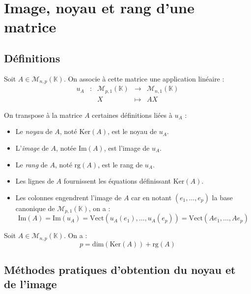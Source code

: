 \documentclass[a4paper,10pt]{report}
\begin{document}
\section{Image, noyau et rang d'une matrice}
\subsection{Définitions}
Soit $A \in \mathcal{M}_{n,p}(\mathbb{K})$. On associe à cette matrice une application linéaire :
$$ \begin{array}{ccccl}
u_A & : & \mathcal{M}_{p,1}(\mathbb{K}) & \rightarrow & \mathcal{M}_{n,1}(\mathbb{K}) \\
& & X & \mapsto & AX
\end{array}$$

\begin{Definition}{} On transpose à la matrice $A$ certaines définitions liées à $u_A$ :
\begin{itemize}
\item Le \emph{noyau} de $A$, noté $\textrm{Ker}(A)$, est le noyau de $u_A$.
\item L'\emph{image} de $A$, notée $\textrm{Im}(A)$, est l'image de $u_A$.
\item Le \emph{rang} de $A$, noté $\textrm{rg}(A)$, est le rang de $u_A$.
\end{itemize}
\end{Definition}

\begin{Remarques}{}
\begin{itemize}
\item Les lignes de $A$ fournissent les équations définissant $\textrm{Ker}(A)$.
\item Les colonnes engendrent l'image de $A$ car en notant $(e_1, \ldots, e_p)$ la base canonique de $ \mathcal{M}_{p,1}(\mathbb{K}) $, on a :
$$ \textrm{Im}(A) = \textrm{Im}(u_A) = \textrm{Vect}(u_A(e_1), \ldots, u_A(e_p))= \textrm{Vect}(Ae_1, \ldots, Ae_p)$$
\end{itemize}
\end{Remarques}{}

\begin{Theoreme}{} Soit $A \in \mathcal{M}_{n,p}(\mathbb{K})$. On a :
$$ p = \textrm{dim}(\textrm{Ker}(A)) + \textrm{rg}(A)$$
\end{Theoreme}

\newpage

\subsection{Méthodes pratiques d'obtention du noyau et de l'image}
\end{document}

